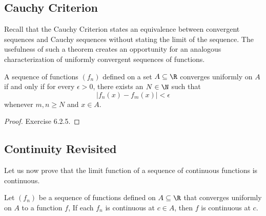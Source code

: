 \subsection{Cauchy Criterion}

Recall that the Cauchy Criterion states an equivalence between convergent sequences and Cauchy sequences without stating the limit of the sequence. The usefulness of such a theorem creates an opportunity for an analogous  characterization of uniformly convergent sequences of functions.

\begin{tcolorbox}
    \begin{thm}
    A sequence of functions \( (f_n)  \) defined on a set \( A \subseteq \R  \) converges uniformly on \( A  \) if and only if for every \( \epsilon > 0  \), there exists an \( N \in \N  \) such that 
    \[  | f_n(x) - f_m(x)  | < \epsilon  \]
    whenever \( m,n \geq N  \) and \( x \in A  \).
    \end{thm}
\end{tcolorbox}
\begin{proof}
Exercise 6.2.5.
\end{proof}

\subsection{Continuity Revisited}

Let us now prove that the limit function of a sequence of continuous functions is continuous.

\begin{tcolorbox}
    \begin{thm}
    Let \( (f_n)  \) be a sequence of functions defined on \( A \subseteq \R  \) that converges uniformly on \( A  \) to a function \( f  \), If each \( f_n   \) is continuous at \( c \in A  \), then \( f  \) is continuous at \( c  \).
    \end{thm}
\end{tcolorbox}

